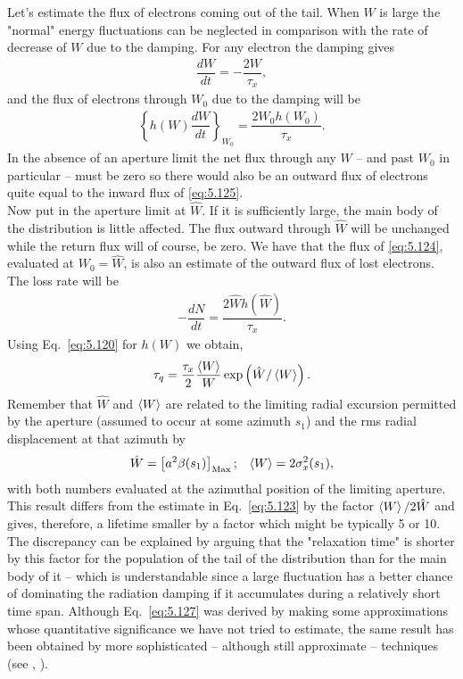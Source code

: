 Let's estimate the flux of electrons coming out of the tail. When $W$ is large the "normal" energy fluctuations can be neglected in comparison with the rate of decrease of $W$ due to the damping. For any electron the damping gives
\begin{align}\label{eq:5.124}
	\dfrac{dW}{dt} = - \dfrac{2W}{\tau_x},
\end{align}
and the flux of electrons through $W_0$ due to the damping will be
\begin{align}\label{eq:5.125}
	\left\lbrace h(W) \dfrac{dW}{dt} \right\rbrace_{W_0} = \dfrac{2 W_0 h(W_0)}{\tau_x}.
\end{align}
In the absence of an aperture limit the net flux through any $W$ -- and past $W_0$ in particular
 -- must be zero so there would also be an outward flux of electrons quite equal to the inward flux of \eqref{eq:5.125}.\\
Now put in the aperture limit at $\hat{W}$. If it is sufficiently large, the main body of the distribution is little affected. The flux outward through $\hat{W}$ will be unchanged while the return flux will of course, be zero. We have that the flux of \eqref{eq:5.124}, evaluated at $W_0 = \hat{W}$, is also an estimate of the outward flux of lost electrons. The loss rate will be
\begin{align}
	-\dfrac{dN}{dt} = \dfrac{2\hat{W}h(\hat{W})}{\tau_x}.
\end{align}
Using Eq.~\eqref{eq:5.120} for $h(W)$ we obtain,
\begin{align}\label{eq:5.127}
	\tau_q = \dfrac{\tau_x}{2} \dfrac{\left< W \right>}{W} \exp \left( \hat{W}/\left< W \right> \right).
\end{align}
Remember that $\hat{W}$ and $\left< W \right>$ are related to the limiting radial excursion permitted by the aperture (assumed to occur at some azimuth $s_1$) and the rms radial displacement at that azimuth by
\begin{align}
	\hat{W} = \left[ a^2 \beta(s_1) \right]_\text{Max}; && \left< W \right> = 2\sigma_x^2(s_1),
\end{align}
with both numbers evaluated at the azimuthal position of the limiting aperture.\\
This result differs from the estimate in Eq.~\eqref{eq:5.123} by the factor $\left< W \right>/2\hat{W}$ and gives, therefore, a lifetime smaller by a factor which might be typically 5 or 10. The discrepancy can be explained by arguing that the "relaxation time" is shorter by this factor for the population of the tail of the distribution than for the main body of it -- which is understandable since a large fluctuation has a better chance of dominating the radiation damping if it accumulates during a relatively short time span. Although Eq.~\eqref{eq:5.127} was derived by making some approximations whose quantitative significance we have not tried to estimate, the same result has been obtained by more sophisticated -- although still approximate -- techniques (see \cite{5}, \cite{15}).\\
